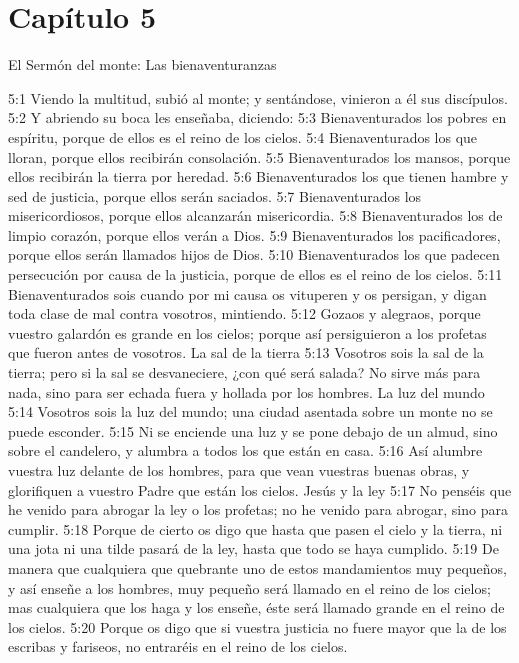 \section*{Capítulo 5}
El Sermón del monte: Las bienaventuranzas  

5:1 Viendo la multitud, subió al monte; y sentándose, vinieron a él sus discípulos. 
5:2 Y abriendo su boca les enseñaba, diciendo: 
5:3 Bienaventurados los pobres en espíritu, porque de ellos es el reino de los cielos. 
5:4 Bienaventurados los que lloran, porque ellos recibirán consolación. 
5:5 Bienaventurados los mansos, porque ellos recibirán la tierra por heredad. 
5:6 Bienaventurados los que tienen hambre y sed de justicia, porque ellos serán saciados. 
5:7 Bienaventurados los misericordiosos, porque ellos alcanzarán misericordia. 
5:8 Bienaventurados los de limpio corazón, porque ellos verán a Dios. 
5:9 Bienaventurados los pacificadores, porque ellos serán llamados hijos de Dios. 
5:10 Bienaventurados los que padecen persecución por causa de la justicia, porque de ellos es el reino de los cielos. 
5:11 Bienaventurados sois cuando por mi causa os vituperen y os persigan, y digan toda clase de mal contra vosotros, mintiendo. 
5:12 Gozaos y alegraos, porque vuestro galardón es grande en los cielos; porque así persiguieron a los profetas que fueron antes de vosotros. 
La sal de la tierra 
5:13 Vosotros sois la sal de la tierra; pero si la sal se desvaneciere, ¿con qué será salada? No sirve más para nada, sino para ser echada fuera y hollada por los hombres. 
La luz del mundo 
5:14 Vosotros sois la luz del mundo; una ciudad asentada sobre un monte no se puede esconder. 
5:15 Ni se enciende una luz y se pone debajo de un almud, sino sobre el candelero, y alumbra a todos los que están en casa. 
5:16 Así alumbre vuestra luz delante de los hombres, para que vean vuestras buenas obras, y glorifiquen a vuestro Padre que están los cielos. 
Jesús y la ley 
5:17 No penséis que he venido para abrogar la ley o los profetas; no he venido para abrogar, sino para cumplir. 
5:18 Porque de cierto os digo que hasta que pasen el cielo y la tierra, ni una jota ni una tilde pasará 
de la ley, hasta que todo se haya cumplido. 
5:19 De manera que cualquiera que quebrante uno de estos mandamientos muy pequeños, y así enseñe a los hombres, muy pequeño será llamado en el reino de los cielos; mas cualquiera que los haga y los enseñe, éste será llamado grande en el reino de los cielos. 
5:20 Porque os digo que si vuestra justicia no fuere mayor que la de los escribas y fariseos, no entraréis en el reino de los cielos. 
